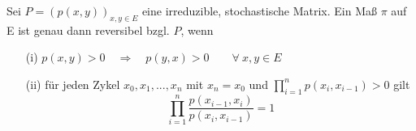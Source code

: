 \label{Kolmogorov's Zykelbedingung}
Sei $P = (p(x,y))_{x,y \in E}$ eine irreduzible, stochastische Matrix. Ein Maß $\pi$ auf E ist genau dann reversibel bzgl. $P$, wenn
\begin{itemize}
\item[(i)] $p(x,y)>0 \quad \Rightarrow \quad p(y,x)>0 \qquad \forall \: x,y \in E$ 
\item[(ii)] für jeden Zykel $x_{0},x_{1},...,x_{n}$ mit $x_{n} = x_{0}$ und $\prod_{i=1}^{n} p(x_{i},x_{i-1})>0$ gilt
\begin{equation*}
\prod_{i=1}^{n} \dfrac{p(x_{i-1},x_{i})}{p(x_{i},x_{i-1})} = 1
\end{equation*} 
\end{itemize}